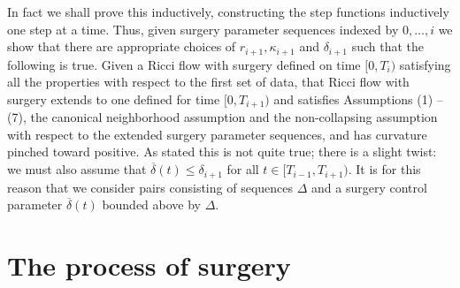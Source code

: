 In fact we shall prove this inductively, constructing the step
functions inductively one step at a time. Thus, given surgery
parameter sequences indexed by $0,\ldots,i$ we show that there are appropriate choices of
$r_{i+1}, \kappa_{i+1}$ and $\delta_{i+1}$ such that the following is true.
Given a Ricci flow with
surgery defined on time $[0,T_i)$ satisfying all the properties with
respect to the first set of data,  that Ricci
flow with surgery extends to one defined for time $[0,T_{i+1})$ and satisfies
Assumptions (1) -- (7), the canonical neighborhood assumption and the
non-collapsing assumption with respect to the extended surgery
parameter sequences, and has curvature pinched toward positive.
As stated this is not quite true; there is a slight twist: we must also assume
that $\overline\delta(t)\le \delta_{i+1}$ for all $t\in [T_{i-1},T_{i+1})$.
It is for this reason that we consider
pairs consisting of sequences $\Delta$ and a surgery control
parameter $\overline\delta(t)$ bounded above by $\Delta$.


\section{The process of surgery}\label{sect:process}


